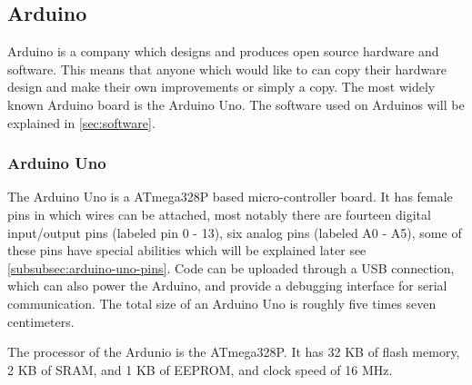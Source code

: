 \subsection{Arduino}
Arduino is a company which designs and produces open source hardware and software.
This means that anyone which would like to can copy their hardware design and make their own improvements or simply a copy.
The most widely known Arduino board is the Arduino Uno.
The software used on Arduinos will be explained in \ref{sec:software}.

\subsubsection{Arduino Uno}
The Arduino Uno is a ATmega328P based micro-controller board.
It has female pins in which wires can be attached, most notably there are fourteen digital input/output pins (labeled pin 0 - 13), six analog pins (labeled A0 - A5), some of these pins have special abilities which will be explained later see \ref{subsubsec:arduino-uno-pins}.
Code can be uploaded through a USB connection, which can also power the Arduino, and provide a debugging interface for serial communication.
The total size of an Arduino Uno is roughly five times seven centimeters. 

The processor of the Ardunio is the ATmega328P.
It has 32 KB of flash memory, 2 KB of SRAM, and 1 KB of EEPROM, and clock speed of 16 MHz.
